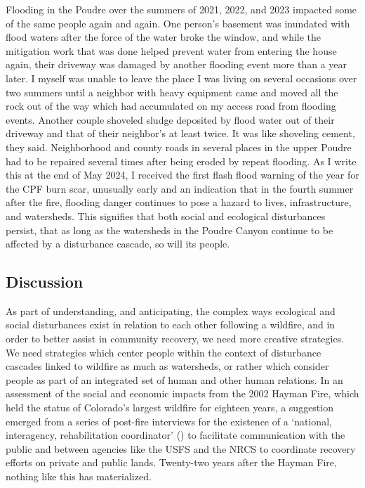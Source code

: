 \documentclass[
]{article}
\begin{document}
Flooding in the Poudre over the summers of 2021, 2022, and 2023 impacted some of the same people again and again. One person's basement was inundated with flood waters after the force of the water broke the window, and while the mitigation work that was done helped prevent water from entering the house again, their driveway was damaged by another flooding event more than a year later. I myself was unable to leave the place I was living on several occasions over two summers until a neighbor with heavy equipment came and moved all the rock out of the way which had accumulated on my access road from flooding events. Another couple shoveled sludge deposited by flood water out of their driveway and that of their neighbor's at least twice. It was like shoveling cement, they said. Neighborhood and county roads in several places in the upper Poudre had to be repaired several times after being eroded by repeat flooding. As I write this at the end of May 2024, I received the first flash flood warning of the year for the CPF burn scar, unusually early and an indication that in the fourth summer after the fire, flooding danger continues to pose a hazard to lives, infrastructure, and watersheds. This signifies that both social and ecological disturbances persist, that as long as the watersheds in the Poudre Canyon continue to be affected by a disturbance cascade, so will its people.

\subsection{Discussion}\label{discussion}

As part of understanding, and anticipating, the complex ways ecological and social disturbances exist in relation to each other following a wildfire, and in order to better assist in community recovery, we need more creative strategies. We need strategies which center people within the context of disturbance cascades linked to wildfire as much as watersheds, or rather which consider people as part of an integrated set of human and other human relations. In an assessment of the social and economic impacts from the 2002 Hayman Fire, which held the status of Colorado's largest wildfire for eighteen years, a suggestion emerged from a series of post-fire interviews for the existence of a `national, interagency, rehabilitation coordinator' () to facilitate communication with the public and between agencies like the USFS and the NRCS to coordinate recovery efforts on private and public lands. Twenty-two years after the Hayman Fire, nothing like this has materialized.
\end{document}
